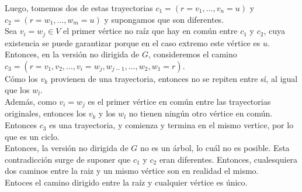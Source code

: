 \documentclass[12pt,a4paper]{report}
\begin{document}
\begin{enumerate}
{\begin{itemize}
{					Luego, tomemos dos de estas trayectorias $c_1 = (r = v_1, ..., v_n = u)$ y
					$c_2 = (r = w_1, ..., w_m = u)$ y supongamos que son diferentes.\\
					Sea $v_i = w_j \in V$ el primer vértice no raíz que hay en común entre
					$c_1$ y $c_2$, cuya existencia se puede garantizar porque en el caso
					extremo este vértice es $u$.\\
					Entonces, en la versión no dirigida de $G$, consideremos el camino
					$c_3 = (r = v_1, v_2, ..., v_i = w_j, w_{j-1}, ..., w_2, w_1 = r)$.\\
					Cómo los $v_k$ provienen de una trayectoria, entonces no se repiten entre
					sí, al igual que los $w_l$.\\
					Además, como $v_i = w_j$ es el primer vértice en común entre las
					trayectorias originales, entonces los $v_k$ y  los $w_l$ no tienen ningún
					otro vértice en común.
					Entonces $c_3$ es una trayectoria, y comienza  y termina en el mismo
					vertice, por lo que es un ciclo.\\
					Entonces, la versión no dirigida de $G$ no es un árbol, lo cuál no es
					posible. Esta contradicción surge de suponer que $c_1$ y $c_2$ eran
					diferentes. Entonces, cualesquiera dos caminos entre la raiz y un mismo
					vértice son en realidad el mismo.\\
					Entoces el camino dirigido entre la raíz y cualquier vértice es único.\\
				}


\end{itemize}}
\end{enumerate}
\end{document}
